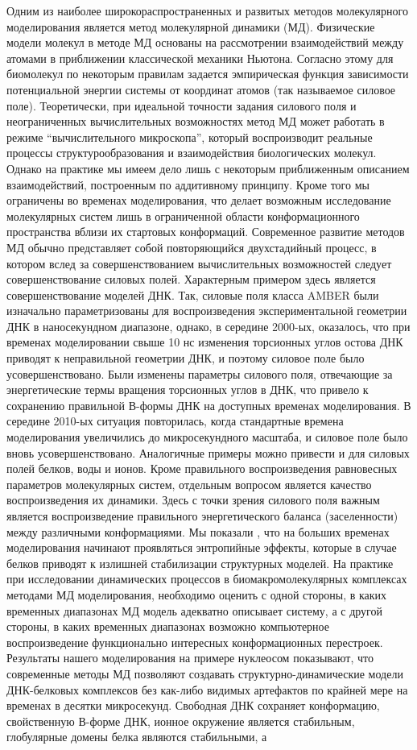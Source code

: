  Одним из наиболее широкораспространенных и развитых методов молекулярного моделирования является метод молекулярной динамики (МД). Физические модели молекул в методе МД основаны на рассмотрении взаимодействий между атомами в приближении классической механики Ньютона. Согласно этому для биомолекул по некоторым правилам задается эмпирическая функция зависимости потенциальной энергии системы от координат атомов (так называемое силовое поле). Теоретически, при идеальной точности задания силового поля и неограниченных вычислительных возможностях метод МД может работать в режиме ``вычислительного микроскопа'', который воспроизводит реальные процессы структурообразования и взаимодействия биологических молекул. Однако на практике мы имеем дело лишь с некоторым приближенным описанием взаимодействий, построенным по аддитивному принципу. Кроме того мы ограничены во временах моделирования, что делает возможным исследование молекулярных систем лишь в ограниченной области конформационного пространства вблизи их стартовых конформаций. Современное развитие методов МД обычно представляет собой повторяющийся двухстадийный процесс, в котором вслед за совершенствованием вычислительных возможностей следует совершенствование силовых полей. Характерным примером здесь является совершенствование моделей ДНК. Так, силовые поля класса AMBER были изначально параметризованы для воспроизведения экспериментальной геометрии ДНК в наносекундном диапазоне, однако, в середине 2000-ых, оказалось, что при временах моделировании свыше 10 нс изменения торсионных углов остова ДНК приводят к неправильной геометрии ДНК, и поэтому силовое поле было усовершенствовано. Были изменены параметры силового поля, отвечающие за энергетические термы вращения торсионных углов в ДНК, что привело к сохранению правильной В-формы ДНК на доступных временах моделирования. В середине 2010-ых ситуация повторилась, когда стандартные времена моделирования увеличились до микросекундного масштаба, и силовое поле было вновь усовершенствовано. Аналогичные примеры можно привести и для силовых полей белков, воды и ионов. Кроме правильного воспроизведения равновесных параметров молекулярных систем, отдельным вопросом является качество воспроизведения их динамики. Здесь с точки зрения силового поля важным является воспроизведение правильного энергетического баланса (заселенности) между различными конформациями. Мы показали \cite{shaytan_free_2010}, что на больших временах моделирования начинают проявляться энтропийные эффекты, которые в случае белков приводят к излишней стабилизации структурных моделей. На практике при исследовании динамических процессов в биомакромолекулярных комплексах методами МД моделирования, необходимо оценить с одной стороны, в каких временных диапазонах МД модель адекватно описывает систему, а с другой стороны, в каких временных диапазонах возможно компьютерное воспроизведение функционально интересных конформационных перестроек. Результаты нашего моделирования на примере нуклеосом показывают, что современные методы МД позволяют создавать структурно-динамические модели ДНК-белковых комплексов без как-либо видимых артефактов по крайней мере на временах в десятки микросекунд. Свободная ДНК сохраняет конформацию, свойственную В-форме ДНК, ионное окружение является стабильным, глобулярные домены белка являются стабильными, а 